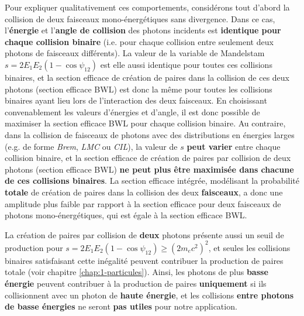 \begin{refsection}
Pour expliquer qualitativement ces comportements, considérons tout d'abord la collision de deux faisceaux mono-énergétiques sans divergence. Dans ce cas, l'\textbf{énergie} et l'\textbf{angle de collision} des photons incidents est \textbf{identique pour chaque collision binaire} (i.e. pour chaque collision entre seulement deux photons de faisceaux différents). La valeur de la variable de Mandelstam $s=2 E_1 E_2 (1-\cos\psi_{12})$ est elle aussi identique pour toutes ces collisions binaires, et la section efficace de création de paires dans la collision de ces deux photons (section efficace BWL) est donc la même pour toutes les collisions binaires ayant lieu lors de l'interaction des deux faisceaux. En choisissant convenablement les valeurs d'énergies et d'angle, il est donc possible de maximiser la section efficace BWL pour chaque collision binaire. Au contraire, dans la collision de faisceaux de photons avec des distributions en énergies larges (e.g. de forme \textit{Brem}, \textit{LMC} ou \textit{CIL}), la valeur de $s$ \textbf{peut varier} entre chaque collision binaire, et la section efficace de création de paires par collision de deux photons (section efficace BWL) \textbf{ne peut plus être maximisée dans chacune de ces collisions binaires}. La section efficace intégrée, modélisant la probabilité \textbf{totale} de création de paires dans la collision des deux \textbf{faisceaux}, a donc une amplitude plus faible par rapport à la section efficace pour deux faisceaux de photons mono-énergétiques, qui est égale à la section efficace BWL.

La création de paires par collision de \textbf{deux} photons présente aussi un seuil de production pour $s = 2 E_1 E_2 (1-\cos{\psi_{12}})\ge (2 m_e c^2)^2$, et seules les collisions binaires satisfaisant cette inégalité peuvent contribuer la production de paires totale (voir chapitre \ref{chap:1-particules}). Ainsi, les photons de plus \textbf{basse énergie} peuvent contribuer à la production de paires \textbf{uniquement} si ils collisionnent avec un photon de \textbf{haute énergie}, et les collisions \textbf{entre photons de basse énergies} ne seront \textbf{pas utiles} pour notre application.


\end{refsection}
